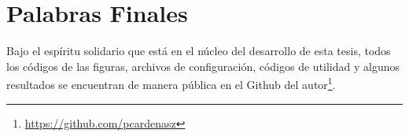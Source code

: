 \section{Palabras Finales}
Bajo el espíritu solidario que está en el núcleo del desarrollo de esta tesis, todos los códigos de las figuras, archivos de configuración, códigos de utilidad y algunos resultados se encuentran de manera pública en el Github del autor\footnote{\url{https://github.com/pcardenasz}}.